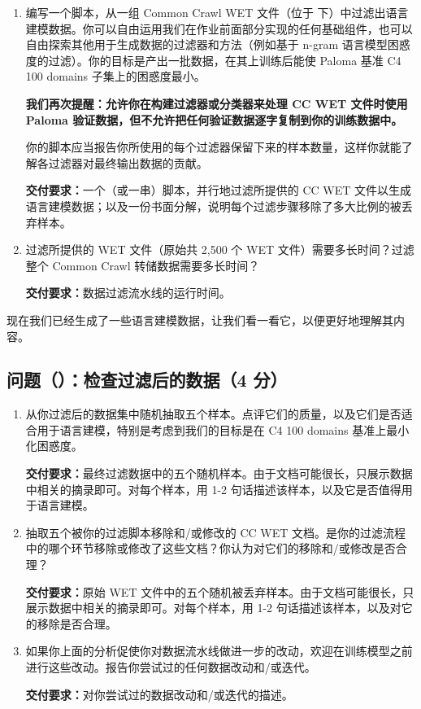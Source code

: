 \begin{enumerate}[label=(\alph*)]
  \item 编写一个脚本，从一组 Common Crawl WET 文件（位于  下）中过滤出语言建模数据。你可以自由运用我们在作业前面部分实现的任何基础组件，也可以自由探索其他用于生成数据的过滤器和方法（例如基于 n-gram 语言模型困惑度的过滤）。你的目标是产出一批数据，在其上训练后能使 Paloma 基准 C4 100 domains 子集上的困惑度最小。

  \textbf{我们再次提醒：允许你在构建过滤器或分类器来处理 CC WET 文件时使用 Paloma 验证数据，但不允许把任何验证数据逐字复制到你的训练数据中。}

  你的脚本应当报告你所使用的每个过滤器保留下来的样本数量，这样你就能了解各过滤器对最终输出数据的贡献。

  \textbf{交付要求：}一个（或一串）脚本，并行地过滤所提供的 CC WET 文件以生成语言建模数据；以及一份书面分解，说明每个过滤步骤移除了多大比例的被丢弃样本。

  \item 过滤所提供的 WET 文件（原始共 2,500 个 WET 文件）需要多长时间？过滤整个 Common Crawl 转储数据需要多长时间？

  \textbf{交付要求：}数据过滤流水线的运行时间。
\end{enumerate}

现在我们已经生成了一些语言建模数据，让我们看一看它，以便更好地理解其内容。

\subsection*{问题（）：检查过滤后的数据（4 分）}

\begin{enumerate}[label=(\alph*)]
  \item 从你过滤后的数据集中随机抽取五个样本。点评它们的质量，以及它们是否适合用于语言建模，特别是考虑到我们的目标是在 C4 100 domains 基准上最小化困惑度。

  \textbf{交付要求：}最终过滤数据中的五个随机样本。由于文档可能很长，只展示数据中相关的摘录即可。对每个样本，用 1-2 句话描述该样本，以及它是否值得用于语言建模。

  \item 抽取五个被你的过滤脚本移除和/或修改的 CC WET 文档。是你的过滤流程中的哪个环节移除或修改了这些文档？你认为对它们的移除和/或修改是否合理？

  \textbf{交付要求：}原始 WET 文件中的五个随机被丢弃样本。由于文档可能很长，只展示数据中相关的摘录即可。对每个样本，用 1-2 句话描述该样本，以及对它的移除是否合理。

  \item 如果你上面的分析促使你对数据流水线做进一步的改动，欢迎在训练模型之前进行这些改动。报告你尝试过的任何数据改动和/或迭代。

  \textbf{交付要求：}对你尝试过的数据改动和/或迭代的描述。
\end{enumerate}


